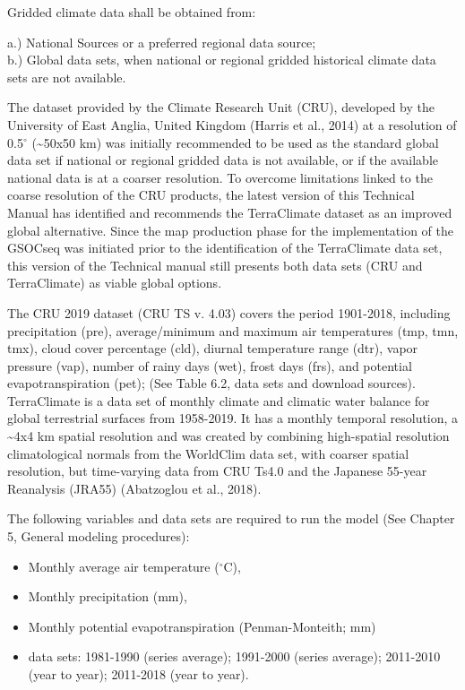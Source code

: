 \documentclass[
  10pt,
  b5paper,
]{book}
\providecommand{\tightlist}{%
  \setlength{\itemsep}{0pt}\setlength{\parskip}{0pt}}
\begin{document}
Gridded climate data shall be obtained from:

a.) National Sources or a preferred regional data source;\\
b.) Global data sets, when national or regional gridded historical climate data sets are not available.

The dataset provided by the Climate Research Unit (CRU), developed by the University of East Anglia, United Kingdom (Harris et al., 2014) at a resolution of 0.5\(^\circ\) (\textasciitilde50x50 km) was initially recommended to be used as the standard global data set if national or regional gridded data is not available, or if the available national data is at a coarser resolution.
To overcome limitations linked to the coarse resolution of the CRU products, the latest version of this Technical Manual has identified and recommends the TerraClimate dataset as an improved global alternative.
Since the map production phase for the implementation of the GSOCseq was initiated prior to the identification of the TerraClimate data set, this version of the Technical manual still presents both data sets (CRU and TerraClimate) as viable global options.

The CRU 2019 dataset (CRU TS v. 4.03) covers the period 1901-2018, including precipitation (pre), average/minimum and maximum air temperatures (tmp, tmn, tmx), cloud cover percentage (cld), diurnal temperature range (dtr), vapor pressure (vap), number of rainy days (wet), frost days (frs), and potential evapotranspiration (pet); (See Table 6.2, data sets and download sources).\\
TerraClimate is a data set of monthly climate and climatic water balance for global terrestrial surfaces from 1958-2019. It has a monthly temporal resolution, a \textasciitilde4x4 km spatial resolution and was created by combining high-spatial resolution climatological normals from the WorldClim data set, with coarser spatial resolution, but time-varying data from CRU Ts4.0 and the Japanese 55-year Reanalysis (JRA55) (Abatzoglou et al., 2018).

The following variables and data sets are required to run the model (See Chapter 5, General modeling procedures):

\begin{itemize}
\tightlist
\item
  Monthly average air temperature (\(^\circ\)C),
\item
  Monthly precipitation (mm),
\item
  Monthly potential evapotranspiration (Penman-Monteith; mm)
\item
  data sets: 1981-1990 (series average); 1991-2000 (series average); 2011-2010 (year to year); 2011-2018 (year to year).
\end{itemize}
\end{document}
